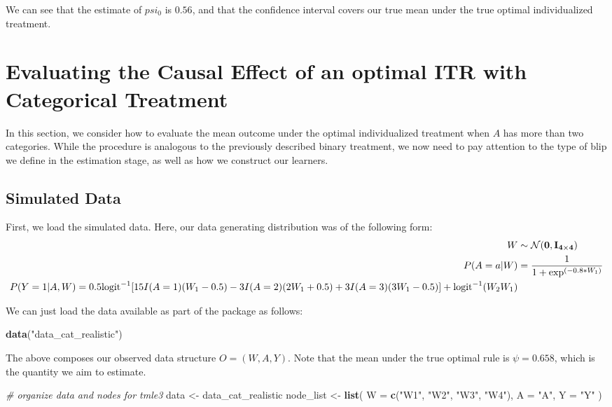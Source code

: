 \documentclass[12pt, krantz2,]{book}
\newenvironment{Shaded}{\begin{snugshade}}{\end{snugshade}}
\newcommand{\CommentTok}[1]{\textcolor[rgb]{0.56,0.35,0.01}{\textit{#1}}}
\newcommand{\DataTypeTok}[1]{\textcolor[rgb]{0.13,0.29,0.53}{#1}}
\newcommand{\KeywordTok}[1]{\textcolor[rgb]{0.13,0.29,0.53}{\textbf{#1}}}
\newcommand{\NormalTok}[1]{#1}
\newcommand{\StringTok}[1]{\textcolor[rgb]{0.31,0.60,0.02}{#1}}
\theoremstyle{definition}
\theoremstyle{definition}
\theoremstyle{definition}
\newcommand{\1}{\mathbbm{1}}
\begin{document}
We can see that the estimate of \(psi_0\) is \(0.56\), and that the confidence
interval covers our true mean under the true optimal individualized treatment.

\hypertarget{oit-eval-cat}{%
\section{Evaluating the Causal Effect of an optimal ITR with Categorical Treatment}\label{oit-eval-cat}}

In this section, we consider how to evaluate the mean outcome under the optimal
individualized treatment when \(A\) has more than two categories. While the
procedure is analogous to the previously described binary treatment, we now need
to pay attention to the type of blip we define in the estimation stage, as well
as how we construct our learners.

\hypertarget{simulated-data-1}{%
\subsection{Simulated Data}\label{simulated-data-1}}

First, we load the simulated data. Here, our data generating distribution was
of the following form:
\begin{align*}
  W &\sim \mathcal{N}(\bf{0},I_{4 \times 4})\\
  P(A=a|W) &= \frac{1}{1+\exp^{(-0.8*W_1)}}\\
  P(Y=1|A,W) = 0.5\text{logit}^{-1}[15I(A=1)(W_1-0.5) - 3I(A=2)(2W_1+0.5) +
    3I(A=3)(3W_1-0.5)] +\text{logit}^{-1}(W_2W_1)
\end{align*}

We can just load the data available as part of the package as follows:

\begin{Shaded}
\begin{Highlighting}[]
\KeywordTok{data}\NormalTok{(}\StringTok{"data_cat_realistic"}\NormalTok{)}
\end{Highlighting}
\end{Shaded}

The above composes our observed data structure \(O = (W, A, Y)\). Note that the
mean under the true optimal rule is \(\psi=0.658\), which is the quantity we aim
to estimate.

\begin{Shaded}
\begin{Highlighting}[]
\CommentTok{# organize data and nodes for tmle3}
\NormalTok{data <-}\StringTok{ }\NormalTok{data_cat_realistic}
\NormalTok{node_list <-}\StringTok{ }\KeywordTok{list}\NormalTok{(}
  \DataTypeTok{W =} \KeywordTok{c}\NormalTok{(}\StringTok{"W1"}\NormalTok{, }\StringTok{"W2"}\NormalTok{, }\StringTok{"W3"}\NormalTok{, }\StringTok{"W4"}\NormalTok{),}
  \DataTypeTok{A =} \StringTok{"A"}\NormalTok{,}
  \DataTypeTok{Y =} \StringTok{"Y"}
\NormalTok{)}
\end{Highlighting}
\end{Shaded}
\end{document}
